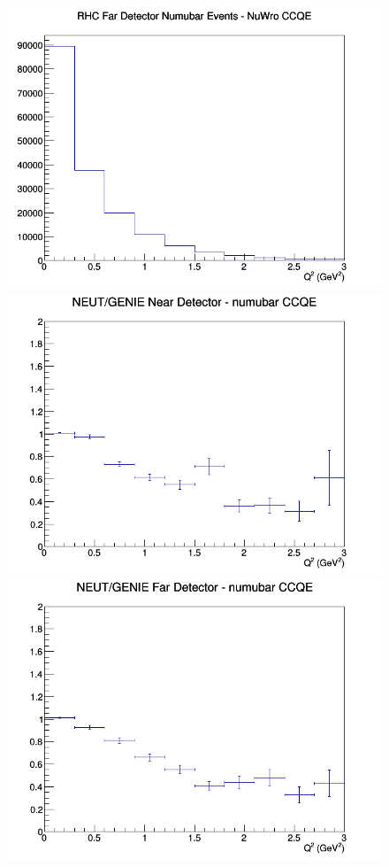 \documentclass[12pt]{article}
\begin{document}
\begin{figure}[h]
\endminipage
{}
\includegraphics[width=\linewidth]{eff_Q2/LAr/CCQE_RHC_FD_numubar_Q2_NuWro.png}
\endminipage
\newline
{}
\includegraphics[width=\linewidth]{eff_Q2/LAr/ratios/CCQE_NEUT_GENIE_numubar_near_Q2.png}
\endminipage
{}
\includegraphics[width=\linewidth]{eff_Q2/LAr/ratios/CCQE_NEUT_GENIE_numubar_far_Q2.png}

\end{figure}
\end{document}
